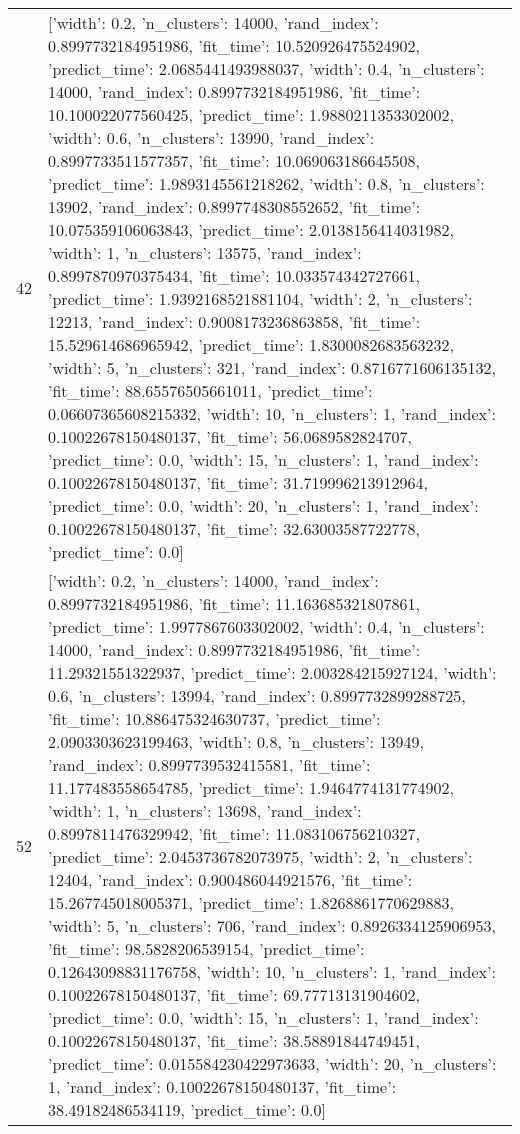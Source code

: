 \begin{tabular}{rl}
42 & [{'width': 0.2, 'n_clusters': 14000, 'rand_index': 0.8997732184951986, 'fit_time': 10.520926475524902, 'predict_time': 2.0685441493988037}, {'width': 0.4, 'n_clusters': 14000, 'rand_index': 0.8997732184951986, 'fit_time': 10.100022077560425, 'predict_time': 1.9880211353302002}, {'width': 0.6, 'n_clusters': 13990, 'rand_index': 0.8997733511577357, 'fit_time': 10.069063186645508, 'predict_time': 1.9893145561218262}, {'width': 0.8, 'n_clusters': 13902, 'rand_index': 0.8997748308552652, 'fit_time': 10.075359106063843, 'predict_time': 2.0138156414031982}, {'width': 1, 'n_clusters': 13575, 'rand_index': 0.8997870970375434, 'fit_time': 10.033574342727661, 'predict_time': 1.9392168521881104}, {'width': 2, 'n_clusters': 12213, 'rand_index': 0.9008173236863858, 'fit_time': 15.529614686965942, 'predict_time': 1.8300082683563232}, {'width': 5, 'n_clusters': 321, 'rand_index': 0.8716771606135132, 'fit_time': 88.65576505661011, 'predict_time': 0.06607365608215332}, {'width': 10, 'n_clusters': 1, 'rand_index': 0.10022678150480137, 'fit_time': 56.0689582824707, 'predict_time': 0.0}, {'width': 15, 'n_clusters': 1, 'rand_index': 0.10022678150480137, 'fit_time': 31.719996213912964, 'predict_time': 0.0}, {'width': 20, 'n_clusters': 1, 'rand_index': 0.10022678150480137, 'fit_time': 32.63003587722778, 'predict_time': 0.0}] \\
52 & [{'width': 0.2, 'n_clusters': 14000, 'rand_index': 0.8997732184951986, 'fit_time': 11.163685321807861, 'predict_time': 1.9977867603302002}, {'width': 0.4, 'n_clusters': 14000, 'rand_index': 0.8997732184951986, 'fit_time': 11.29321551322937, 'predict_time': 2.003284215927124}, {'width': 0.6, 'n_clusters': 13994, 'rand_index': 0.8997732899288725, 'fit_time': 10.886475324630737, 'predict_time': 2.0903303623199463}, {'width': 0.8, 'n_clusters': 13949, 'rand_index': 0.8997739532415581, 'fit_time': 11.177483558654785, 'predict_time': 1.9464774131774902}, {'width': 1, 'n_clusters': 13698, 'rand_index': 0.8997811476329942, 'fit_time': 11.083106756210327, 'predict_time': 2.0453736782073975}, {'width': 2, 'n_clusters': 12404, 'rand_index': 0.900486044921576, 'fit_time': 15.267745018005371, 'predict_time': 1.8268861770629883}, {'width': 5, 'n_clusters': 706, 'rand_index': 0.8926334125906953, 'fit_time': 98.5828206539154, 'predict_time': 0.12643098831176758}, {'width': 10, 'n_clusters': 1, 'rand_index': 0.10022678150480137, 'fit_time': 69.77713131904602, 'predict_time': 0.0}, {'width': 15, 'n_clusters': 1, 'rand_index': 0.10022678150480137, 'fit_time': 38.58891844749451, 'predict_time': 0.015584230422973633}, {'width': 20, 'n_clusters': 1, 'rand_index': 0.10022678150480137, 'fit_time': 38.49182486534119, 'predict_time': 0.0}] \\

\end{tabular}
